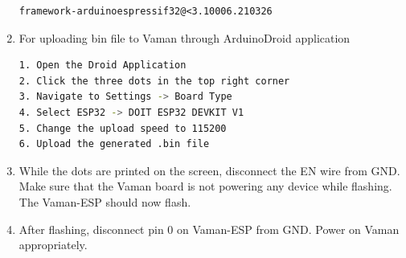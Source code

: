 \begin{enumerate}[label=\thesection.\arabic*.,ref=\thesection.\theenumi]
\begin{lstlisting}
framework-arduinoespressif32@<3.10006.210326
\end{lstlisting}
\item For uploading bin file to Vaman through ArduinoDroid application 
\begin{lstlisting}[language=bash]
1. Open the Droid Application
2. Click the three dots in the top right corner
3. Navigate to Settings -> Board Type
4. Select ESP32 -> DOIT ESP32 DEVKIT V1
5. Change the upload speed to 115200
6. Upload the generated .bin file
\end{lstlisting}
\item While the dots are printed on the screen, disconnect the EN wire from GND.   Make sure that the Vaman board is not powering any device while flashing.  The Vaman-ESP should now flash.
\item After flashing, disconnect pin 0 on Vaman-ESP from GND. Power on Vaman appropriately.
\end{enumerate}
